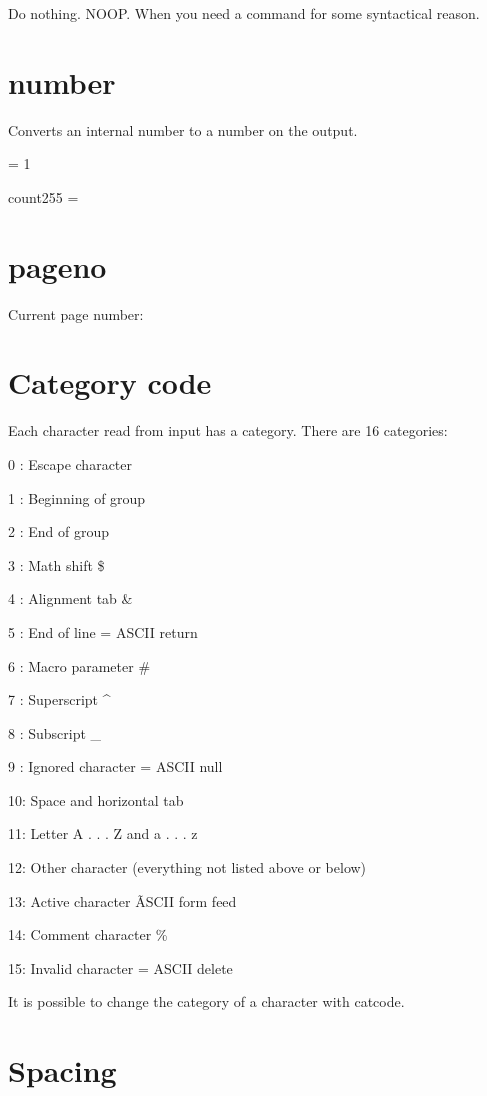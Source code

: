   Do nothing. NOOP. When you need a command for some syntactical reason.

  \relax

\section{number}

  Converts an internal number to a number on the output.

   = 1

  \bs count255 = \number{}

\section{pageno}

  Current page number: \number\pageno

\section{Category code}

  Each character read from input has a category. There are 16 categories:

  0 : Escape character \bs

  1 : Beginning of group \ob

  2 : End of group \cb

  3 : Math shift \$

  4 : Alignment tab \&

  5 : End of line = ASCII return

  6 : Macro parameter \#

  7 : Superscript \^{}

  8 : Subscript \_

  9 : Ignored character = ASCII null

  10: Space and horizontal tab

  11: Letter A . . . Z and a . . . z

  12: Other character (everything not listed above or below)

  13: Active character \~  ASCII form feed

  14: Comment character \%

  15: Invalid character = ASCII delete

  It is possible to change the category of a character with \bs catcode.

\section{Spacing}

